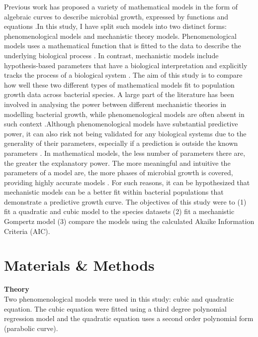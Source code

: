 \documentclass[11pt]{article}
\begin{document}
Previous work has proposed a variety of mathematical models in the form of algebraic curves to describe 
microbial growth, expressed by functions and equations \cite{soboleva_predictive_2000,peleg_microbial_2011}.In this study, I have split such 
models into two distinct forms: phenomenological models and mechanistic theory models. Phenomenological 
models uses a mathematical function that is fitted to the data to describe the underlying biological process \cite{white_should_2019}.
In contrast, mechanistic models include hypothesis-based parameters that have a biological interpretation 
and explicitly tracks the process of a biological system \cite{geritz_mathematical_2012}. The aim of this study is to compare how well 
these two different types of mathematical models fit to population growth data across bacterial species. A 
large part of the literature has been involved in analysing the power between different mechanistic theories 
in modelling bacterial growth, while phenomenological models are often absent in such context \cite{gibson_predicting_1988,adair_comparison_1989,labuza_growth_1993,mackey_effect_1988}.Although
phenomenological models have substantial predictive power, it can also risk not being validated for any
biological systems due to the generality of their parameters, especially if a prediction is outside the known 
parameters \cite{heitzer_utility_1991,schiraldi_phenomenological_nodate,geritz_mathematical_2012}. In mathematical models, the less number of parameters there are, the greater the explanatory
power. The more meaningful and intuitive the parameters of a model are, the more phases of microbial growth
is covered, providing highly accurate models \cite{esser_modeling_2015}. For such reasons, it can be hypothesized that mechanistic
models can be a better fit within bacterial populations that demonstrate a predictive growth 
curve. The objectives of this study were to (1) fit a quadratic and cubic model to the species datasets (2) 
fit a mechanistic Gompertz model (3) compare the models using the calculated Akaike Information Criteria 
(AIC). 

\section{Materials \& Methods}

\noindent\textbf{Theory} \\

Two phenomenological models were used in this study: cubic and quadratic equation. The cubic equation were
fitted using a third degree polynomial regression model and the quadratic equation uses a second order
polynomial form (parabolic curve). \\
\end{document}
